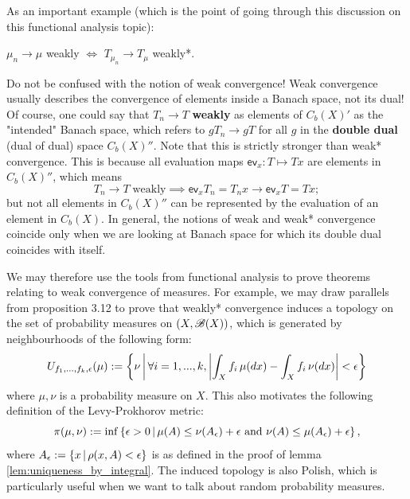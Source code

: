 \begin{unexaminable}
As an important example (which is the point of going through this discussion on this functional analysis topic):
\begin{example}
$\mu_n \to \mu$ weakly $\iff$ $T_{\mu_n} \to T_\mu$ weakly*.
\end{example}

\begin{remark}
Do not be confused with the notion of weak convergence! Weak convergence usually describes the convergence of elements inside a Banach space, not its dual! Of course, one could say that $T_n \to T$ \textbf{weakly} as elements of $C_b(X)'$ as the "intended" Banach space, which refers to $gT_n \to gT$ for all $g$ in the \textbf{double dual} (dual of dual) space $C_b(X)''$. Note that this is strictly stronger than weak* convergence. This is because all evaluation maps $\mathsf{ev}_x: T \mapsto Tx$ are elements in $C_b(X)''$, which means 
\begin{equation*}
    T_n \to T \; \text{weakly} \implies \mathsf{ev}_x T_n = T_n x \to \mathsf{ev}_x T = Tx;
\end{equation*}
but not all elements in $C_b(X)''$ can be represented by the evaluation of an element in $C_b(X)$. In general, the notions of weak and weak* convergence coincide only when we are looking at Banach space for which its double dual coincides with itself.
\end{remark}

We may therefore use the tools from functional analysis to prove theorems relating to weak convergence of measures. For example, we may draw parallels from proposition 3.12 to prove that weakly* convergence induces a topology on the set of probability measures on $(X,\mathcal{B}(X))$, which is generated by neighbourhoods of the following form:
\begin{equation}
    U_{f_1,...,f_k,\epsilon}(\mu) := \left\{ \nu \,\bigg|\, \forall i = 1,...,k, \left| \int_X f_i \, \mu(dx) - \int_X f_i \, \nu(dx) \right| < \epsilon \right \}
\end{equation}
where $\mu, \nu$ is a probability measure on $X$. This also motivates the following definition of the Levy-Prokhorov metric:
\begin{equation}
    \pi(\mu,\nu) := \inf \left\{ \epsilon > 0 \,|\, \mu(A) \leq \nu(A_\epsilon) + \epsilon \text{ and } \nu(A) \leq \mu(A_\epsilon) + \epsilon \right \},
\end{equation}
where $A_\epsilon := \left\{ x \,|\, \rho(x,A) < \epsilon \right \}$ is as defined in the proof of lemma \ref{lem:uniqueness_by_integral}. The induced topology is also Polish, which is particularly useful when we want to talk about random probability measures.


\end{unexaminable}
